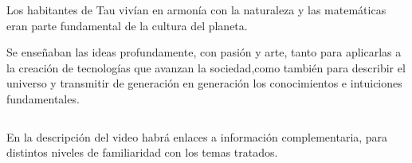 \documentclass[preview]{standalone}
\begin{document}
\begin{center}
Los habitantes de Tau vivían en armonía con la naturaleza y las matemáticas eran parte fundamental de la cultura del planeta. 

Se enseñaban las ideas profundamente, con pasión y arte, tanto para aplicarlas a la creación de tecnologías que avanzan la sociedad,como también para describir el universo  y transmitir de generación en generación los conocimientos e intuiciones fundamentales. 

$$ $$ 

En la descripción del video habrá enlaces a información complementaria, para distintos niveles de familiaridad con los temas tratados.
\end{center}
\end{document}

